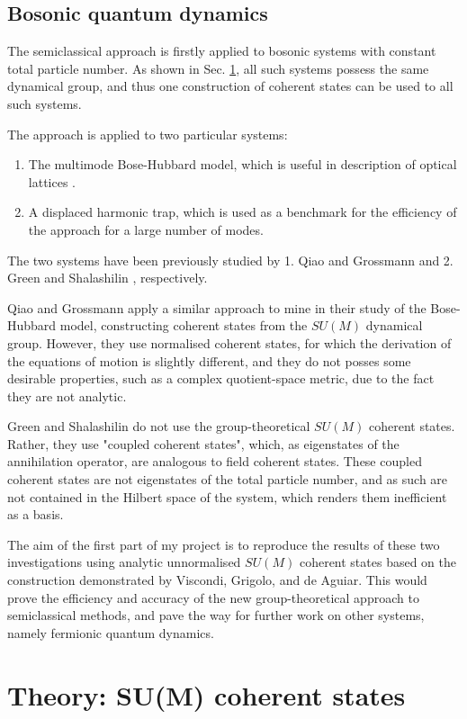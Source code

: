 \documentclass[12pt]{article}
\begin{document}
	\subsection{Bosonic quantum dynamics}
	The semiclassical approach is firstly applied to bosonic systems with constant total particle number. As shown in Sec. \ref{sec:sum}, all such systems possess the same dynamical group, and thus one construction of coherent states can be used to all such systems.
	
	The approach is applied to two particular systems:
	\begin{enumerate}
		\item The multimode Bose-Hubbard model, which is useful in description of optical lattices \cite{optical_lattices}.
		\item A displaced harmonic trap, which is used as a benchmark for the efficiency of the approach for a large number of modes.
	\end{enumerate}
	The two systems have been previously studied by 1. Qiao and Grossmann \cite{grossmann} and 2. Green and Shalashilin \cite{green}, respectively.
	
	Qiao and Grossmann apply a similar approach to mine in their study of the Bose-Hubbard model, constructing coherent states from the $SU(M)$ dynamical group. However, they use normalised coherent states, for which the derivation of the equations of motion is slightly different, and they do not posses some desirable properties, such as a complex quotient-space metric, due to the fact they are not analytic.
	
	Green and Shalashilin do not use the group-theoretical $SU(M)$ coherent states. Rather, they use "coupled coherent states", which, as eigenstates of the annihilation operator, are analogous to field coherent states. These coupled coherent states are not eigenstates of the total particle number, and as such are not contained in the Hilbert space of the system, which renders them inefficient as a basis.
	
	The aim of the first part of my project is to reproduce the results of these two investigations using analytic unnormalised $SU(M)$ coherent states based on the construction demonstrated by Viscondi, Grigolo, and de Aguiar. This would prove the efficiency and accuracy of the new group-theoretical approach to semiclassical methods, and pave the way for further work on other systems, namely fermionic quantum dynamics.
	
	\section{Theory: SU(M) coherent states} \label{sec:sum}
	
\end{document}

